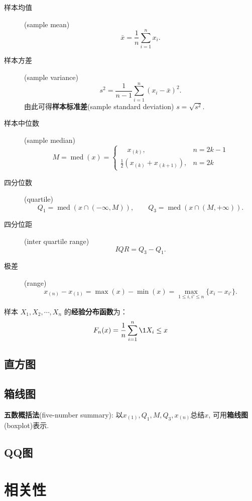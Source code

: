 \begin{description}
      \item [样本均值](sample mean)
            \[ \bar{x} = \frac1n\sum_{i=1}^{n}x_{i}. \]
      \item [样本方差](sample variance)
            \[ s^{2} = \frac{1}{n-1}\sum_{i=1}^{n}(x_{i}-\bar{x})^{2}. \]
            由此可得\textbf{样本标准差}(sample standard deviation) $s = \sqrt{s^2}$.
      \item [样本中位数](sample median)
            \[ M = \operatorname{med}(x) = \begin{cases}
                        \quad x_{(k)},                  & n = 2k-1 \\
                        \frac{1}{2}(x_{(k)}+x_{(k+1)}), & n = 2k
                  \end{cases} \]
            
      \item [四分位数](quartile)
            \[ Q_{1} = \operatorname{med}(x\cap(-\infty,M)), \qquad
                  Q_{3} = \operatorname{med}(x\cap(M,+\infty)). \]
      \item [四分位距](inter quartile range)
            \[ \mathit{IQR} = Q_{3} - Q_{1}. \]
      \item [极差](range)
            \[ x_{(n)}-x_{(1)} = \max(x)-\min(x) = \max_{1\leq i,i' \leq n}\{x_{i}-x_{i'}\}. \]
\end{description}

\begin{definition}[经验分布函数]
      样本 $X_1,X_2,\cdots,X_n$ 的\textbf{经验分布函数}为：
      \[ F_n(x) = \frac1n\sum_{i=1}^n \1{X_i \le x}  \]
\end{definition}

\subsection{直方图}

\subsection{箱线图}

\begin{definition}
      \textbf{五数概括法}(five-number summary): 以$x_{(1)},Q_{1},M,Q_{3},x_{(n)}$总结$x$, 可用\textbf{箱线图}(boxplot)表示.
\end{definition}

\subsection{QQ图}



\section{相关性}